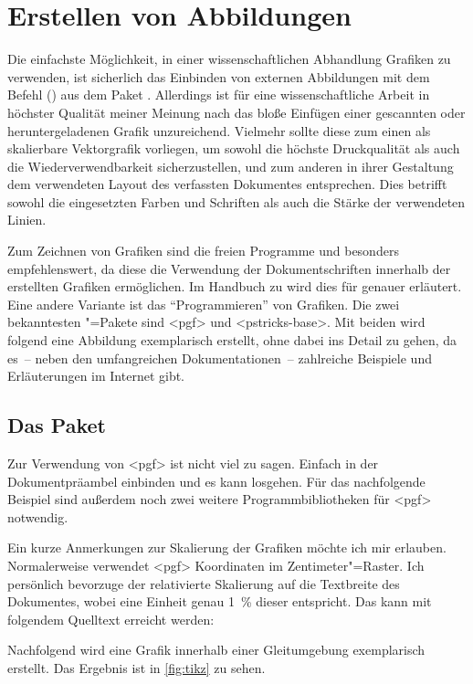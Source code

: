 \documentclass[%
  english,ngerman,%
  cdgeometry=no,DIV=12,automark%
]{tudscrartcl}
\begin{document}
\section{Erstellen von Abbildungen}
\label{sec:figures}%
%
Die einfachste Möglichkeit, in einer wissenschaftlichen Abhandlung Grafiken zu 
verwenden, ist sicherlich das Einbinden von externen Abbildungen mit dem Befehl 
() aus dem Paket . 
Allerdings ist für eine wissenschaftliche Arbeit in höchster Qualität meiner 
Meinung nach das bloße Einfügen einer gescannten oder heruntergeladenen Grafik 
unzureichend. Vielmehr sollte diese zum einen als skalierbare Vektorgrafik 
vorliegen, um sowohl die höchste Druckqualität als auch die 
Wiederverwendbarkeit sicherzustellen, und zum anderen in ihrer Gestaltung dem 
verwendeten Layout des verfassten Dokumentes entsprechen. Dies betrifft sowohl 
die eingesetzten Farben und Schriften als auch die Stärke der verwendeten 
Linien.

Zum Zeichnen von Grafiken sind die freien Programme  und 
besonders  empfehlenswert, da diese die Verwendung der 
Dokumentschriften innerhalb der erstellten Grafiken ermöglichen. Im Handbuch zu 
\TUDScript wird dies für  
genauer erläutert. Eine andere Variante ist das \enquote{Programmieren} von 
Grafiken. Die zwei bekanntesten "=Pakete sind <pgf> 
und <pstricks-base>. Mit beiden wird folgend eine Abbildung 
exemplarisch erstellt, ohne dabei ins Detail zu gehen, da es~-- neben den 
umfangreichen Dokumentationen~-- zahlreiche Beispiele und Erläuterungen im 
Internet gibt.



\subsection{Das Paket }
Zur Verwendung von <pgf> ist nicht viel zu sagen. Einfach in der 
Dokumentpräambel einbinden und es kann losgehen. Für das nachfolgende Beispiel 
sind außerdem noch zwei weitere Programmbibliotheken für <pgf> 
notwendig.
%
\begin{Hint}
\usepackage{tikz}
\usetikzlibrary{chains}
\usetikzlibrary{decorations.markings}
\tikzset{on grid}
\end{Hint}
%
Ein kurze Anmerkungen zur Skalierung der Grafiken möchte ich mir erlauben. 
Normalerweise verwendet <pgf> Koordinaten im Zentimeter"=Raster. 
Ich persönlich bevorzuge der relativierte Skalierung auf die Textbreite des 
Dokumentes, wobei eine Einheit genau \SI{1}{\percent} dieser entspricht. Das 
kann mit folgendem Quelltext erreicht werden:
%
\CodeHook{\renewcommand\newlength[1]{}}
\begin{Hint*}
\newlength{\tikzunit}
\setlength{\tikzunit}{.01\textwidth}
\tikzset{x=\tikzunit,y=\tikzunit}
\end{Hint*}
%
Nachfolgend wird eine Grafik innerhalb einer Gleitumgebung exemplarisch 
erstellt. Das Ergebnis ist in \autoref{fig:tikz} zu sehen.
\end{document}
